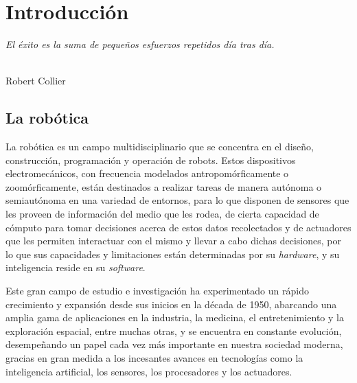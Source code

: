 \chapter{Introducción}
\label{cap:capitulo1}
\setcounter{page}{1}

\begin{flushright}
\begin{minipage}[]{10cm}
\emph{El éxito es la suma de pequeños esfuerzos repetidos día tras día.}\\
\end{minipage}\\

Robert Collier\\
\end{flushright}

\vspace{1cm}



\section{La robótica}
\label{sec:robotica} %

La robótica es un campo multidisciplinario que se concentra en el diseño,
construcción, programación y operación de robots.
Estos dispositivos electromecánicos, con frecuencia modelados
antropomórficamente o zoomórficamente, están destinados a realizar tareas de
manera autónoma o semiautónoma en una variedad de entornos, para lo que disponen
de sensores que les proveen de información del medio que les rodea, de cierta
capacidad de cómputo para tomar decisiones acerca de estos datos recolectados y
de actuadores que les permiten interactuar con el mismo y llevar a cabo dichas
decisiones, por lo que sus capacidades y limitaciones están determinadas por su
\textit{hardware}, y su inteligencia reside en su \textit{software}.

Este gran campo de estudio e investigación ha experimentado un rápido
crecimiento y expansión desde sus inicios en la década de 1950, abarcando una
amplia gama de aplicaciones en la industria, la medicina, el entretenimiento y
la exploración espacial, entre muchas otras, y se encuentra en constante
evolución, desempeñando un papel cada vez más importante en nuestra sociedad
moderna, gracias en gran medida a los incesantes avances en tecnologías como la
inteligencia artificial, los sensores, los procesadores y los actuadores.



